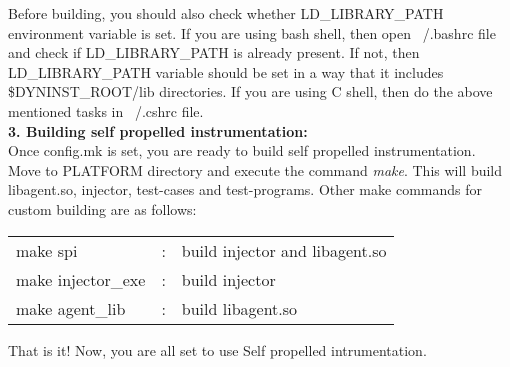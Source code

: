 Before building, you should also check whether LD\_LIBRARY\_PATH environment variable is set. If you are using bash shell, then open ~/.bashrc file and check if LD\_LIBRARY\_PATH is already present. If not, then LD\_LIBRARY\_PATH variable should be set in a way that it includes {\$DYNINST\_ROOT}/lib directories.  If you are using C shell, then do the above mentioned tasks in ~/.cshrc file. \\
 
\textbf{3. Building self propelled instrumentation:} \\
Once config.mk is set, you are ready to build self propelled instrumentation. Move to PLATFORM directory  and execute the command \textit{make}. This will build libagent.so, injector, test-cases and  test-programs. Other make commands for custom building are as follows:

\begin{table}[h]
\begin{tabular}{l c l}
make spi&:& build injector and libagent.so \\
make injector\_exe&:& build injector \\
make agent\_lib&: &build libagent.so  \\
\end{tabular}
\end{table}

That is it! Now, you are all set to use Self propelled intrumentation.

